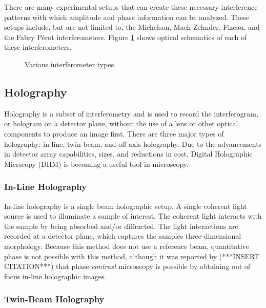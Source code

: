 \documentclass[10pt,letterpaper]{article}
\begin{document}
 There are many experimental setups that can create these necessary interference patterns with which amplitude and phase information can be analyzed. These setups include, but are not limited to, the Michelson, Mach-Zehnder, Fizeau, and the Fabry P\'{e}rot interferometers. Figure \ref{fig:types} shows optical schematics of each of these interferometers.
 
 \begin{figure}
 \centering
 \label{fig:types}
 \caption{Various interferometer types}
 \end{figure}
 
 \subsection{Holography}
 
 Holography is a subset of interferometry and is used to record the interferogram, or hologram on a detector plane, without the use of a lens or other optical components to produce an image first. There are three major types of holography: in-line, twin-beam, and off-axis holography. Due to the advancements in detector array capabilities, sizes, and reductions in cost, Digital Holographic Micrscopy (DHM) is becoming a useful tool in microscopy.
 
 \subsubsection{In-Line Holography}
 
 In-line holography is a single beam holographic setup. A single coherent light source is used to illuminate a sample of interest. The coherent light interacts with the sample by being absorbed and/or diffracted. The light interactions are recorded at a detector plane, which captures the samples three-dimensional morphology. Because this method does not use a reference beam, quantitative phase is not possible with this method, although it was reported by (***INSERT CITATION***) that phase \textit{contrast} microscopy is possible by obtaining out of focus in-line holographic images.
 
 \subsubsection{Twin-Beam Holography}
\end{document}
